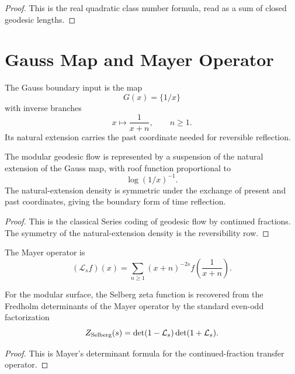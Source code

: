 \begin{proof}
This is the real quadratic class number formula, read as a sum of closed
geodesic lengths.
\end{proof}

\section{Gauss Map and Mayer Operator}
\label{sec:innovation-input-boundary-gauss-mayer}

\begin{definition}
\label{def:innovation-input-boundary-gauss-input}
The Gauss boundary input is the map
$$
G(x)=\{1/x\}
$$
with inverse branches
$$
x\longmapsto \frac{1}{x+n},
\qquad n\ge1.
$$
Its natural extension carries the past coordinate needed for reversible
reflection.
\end{definition}

\begin{theorem}
\label{thm:innovation-input-boundary-geodesic-suspension}
The modular geodesic flow is represented by a suspension of the natural
extension of the Gauss map, with roof function proportional to
$$
\log(1/x)^{-1}.
$$
The natural-extension density is symmetric under the exchange of present
and past coordinates, giving the boundary form of time reflection.
\end{theorem}

\begin{proof}
This is the classical Series coding of geodesic flow by continued
fractions. The symmetry of the natural-extension density is the reversibility
row.
\end{proof}

\begin{definition}
\label{def:innovation-input-boundary-mayer-operator}
The Mayer operator is
$$
(\mathcal L_sf)(x)
=
\sum_{n\ge1}(x+n)^{-2s}f\left(\frac1{x+n}\right).
$$
\end{definition}

\begin{theorem}
\label{thm:innovation-input-boundary-selberg-determinant-row}
For the modular surface, the Selberg zeta function is recovered from the
Fredholm determinants of the Mayer operator by the standard even-odd
factorization
$$
Z_{\rm Selberg}(s)
=
\det(1-\mathcal L_s)\det(1+\mathcal L_s).
$$
\end{theorem}

\begin{proof}
This is Mayer's determinant formula for the continued-fraction transfer
operator.
\end{proof}


